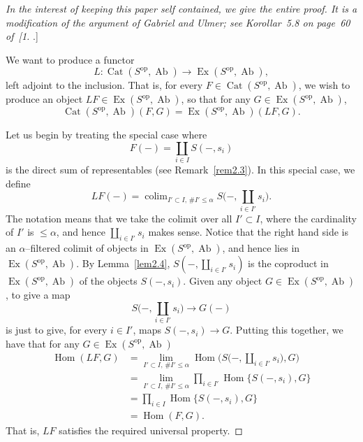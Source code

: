 \documentclass[11pt,a4paper]{article}
\theoremstyle{plain}
\theoremstyle{definition}
\DeclareMathOperator{\Hom}{Hom}
\DeclareMathOperator{\colim}{colim}
\DeclareMathOperator{\Cat}{Cat}
\DeclareMathOperator{\Ex}{Ex}
\DeclareMathOperator{\Ab}{Ab}
\newcommand{\op}{\mathrm{op}}
\numberwithin{equation}{section}
\begin{document}
\begin{proof}
[In the interest of keeping this paper self contained, we give the entire proof. It is a modification of the argument of Gabriel and Ulmer; see Korollar~5.8 on page~60 of~[1].]

We want to produce a functor
\begin{equation*}
L: \Cat(S^{\op},\Ab) \longrightarrow \Ex(S^{\op},\Ab),
\end{equation*}
left adjoint to the inclusion. That is, for every $F \in \Cat(S^{\op},\Ab)$, we wish to produce an object $LF \in \Ex(S^{\op},\Ab)$, so that for any $G \in \Ex(S^{\op},\Ab)$,
\begin{equation*}
\Cat(S^{\op},\Ab)(F,G) = \Ex(S^{\op},\Ab)(LF,G).
\end{equation*}

Let us begin by treating the special case where
\begin{equation*}
F(-) = \coprod_{i\in I} S(-,s_{i})
\end{equation*}
is the direct sum of representables (see Remark~\ref{rem2.3}). In this special case, we define
\begin{equation*}
LF(-) = \colim_{I'\subset I,\,\#I'\leq\alpha} S\Big(-,\coprod_{i\in I'} s_{i}\Big).
\end{equation*}
The notation means that we take the colimit over all $I' \subset I$, where the cardinality of $I'$ is $\leq\alpha$, and hence $\coprod_{i\in I'} s_{i}$ makes sense. Notice that the right hand side is an $\alpha$--filtered colimit of objects in $\Ex(S^{\op},\Ab)$, and hence lies in $\Ex(S^{\op},\Ab)$. By Lemma~\ref{lem2.4}, $S(-,\coprod_{i\in I'} s_{i})$ is the coproduct in $\Ex(S^{\op},\Ab)$ of the objects $S(-,s_{i})$. Given any object $G \in \Ex(S^{\op},\Ab)$, to give a map
\begin{equation*}
S\Big(-,\coprod_{i\in I'} s_{i}\Big) \longrightarrow G(-)
\end{equation*}
is just to give, for every $i \in I'$, maps $S(-,s_{i}) \to G$. Putting this together, we have that for any $G \in \Ex(S^{\op},\Ab)$
\begin{align*}
\Hom(LF,G) &= \lim_{I'\subset I,\,\#I'\leq\alpha} \Hom\Big(S\Big(-,\coprod_{i\in I'} s_{i}\Big),G\Big) \\
&= \lim_{I'\subset I,\,\#I'\leq\alpha} \prod_{i\in I'} \Hom\{S(-,s_{i}),G\} \\
&= \prod_{i\in I} \Hom\{S(-,s_{i}),G\} \\
&= \Hom(F,G).
\end{align*}
That is, $LF$ satisfies the required universal property.


\end{proof}
\end{document}
